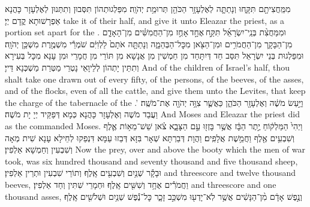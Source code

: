 {מִמַּֽחֲצִיתָ֖ם תִּקָּ֑חוּ וְנָתַתָּ֛ה לְאֶלְעָזָ֥ר הַכֹּהֵ֖ן תְּרוּמַ֥ת יְהֹוָֽה׃}
{מִפַּלְגוּתְהוֹן תִּסְּבוּן וְתִתְּנוּן לְאֶלְעָזָר כָּהֲנָא אַפְרָשׁוּתָא קֳדָם יְיָ׃}
{take it of their half, and give it unto Eleazar the priest, as a portion set apart for the \lord.}{}
{וּמִמַּחֲצִ֨ת בְּנֵֽי־יִשְׂרָאֵ֜ל תִּקַּ֣ח \legarmeh  אֶחָ֣ד \legarmeh  אָחֻ֣ז מִן־הַחֲמִשִּׁ֗ים מִן־הָאָדָ֧ם מִן־הַבָּקָ֛ר מִן־הַחֲמֹרִ֥ים וּמִן־הַצֹּ֖אן מִכׇּל־הַבְּהֵמָ֑ה וְנָתַתָּ֤ה אֹתָם֙ לַלְוִיִּ֔ם שֹׁמְרֵ֕י מִשְׁמֶ֖רֶת מִשְׁכַּ֥ן יְהֹוָֽה׃}
{וּמִפַּלְגוּת בְּנֵי יִשְׂרָאֵל תִּסַּב חַד דְּיִתָּחַד מִן חַמְשִׁין מִן אֲנָשָׁא מִן תּוֹרֵי מִן חֲמָרֵי וּמִן עָנָא מִכָּל בְּעִירָא וְתִתֵּין יָתְהוֹן לְלֵיוָאֵי נָטְרֵי מַטְּרַת מַשְׁכְּנָא דַּייָ׃}
{And of the children of Israel’s half, thou shalt take one drawn out of every fifty, of the persons, of the beeves, of the asses, and of the flocks, even of all the cattle, and give them unto the Levites, that keep the charge of the tabernacle of the \lord.’}{}
{וַיַּ֣עַשׂ מֹשֶׁ֔ה וְאֶלְעָזָ֖ר הַכֹּהֵ֑ן כַּאֲשֶׁ֛ר צִוָּ֥ה יְהֹוָ֖ה אֶת־מֹשֶֽׁה׃}
{וַעֲבַד מֹשֶׁה וְאֶלְעָזָר כָּהֲנָא כְּמָא דְּפַקֵּיד יְיָ יָת מֹשֶׁה׃}
{And Moses and Eleazar the priest did as the \lord\space commanded Moses.}{}
{וַיְהִי֙ הַמַּלְק֔וֹחַ יֶ֣תֶר הַבָּ֔ז אֲשֶׁ֥ר בָּזְז֖וּ עַ֣ם הַצָּבָ֑א צֹ֗אן שֵׁשׁ־מֵא֥וֹת אֶ֛לֶף וְשִׁבְעִ֥ים אֶ֖לֶף וַחֲמֵ֥שֶׁת אֲלָפִֽים׃
}
{וַהֲוָת דְּבַרְתָּא שְׁאָר בִּזָּא דְּבַזוּ עַמָּא דִּנְפַקוּ לְחֵילָא עָנָא שִׁית מְאָה וְשִׁבְעִין וְחַמְשָׁא אַלְפִין׃}
{Now the prey, over and above the booty which the men of war took, was six hundred thousand and seventy thousand and five thousand sheep,}{}
{וּבָקָ֕ר שְׁנַ֥יִם וְשִׁבְעִ֖ים אָֽלֶף׃}
{וְתוֹרֵי שִׁבְעִין וּתְרֵין אַלְפִין׃}
{and threescore and twelve thousand beeves,}{}
{וַחֲמֹרִ֕ים אֶחָ֥ד וְשִׁשִּׁ֖ים אָֽלֶף׃}
{וּחְמָרֵי שִׁתִּין וְחַד אַלְפִין׃}
{and threescore and one thousand asses,}{}
{וְנֶ֣פֶשׁ אָדָ֔ם מִ֨ן־הַנָּשִׁ֔ים אֲשֶׁ֥ר לֹֽא־יָדְע֖וּ מִשְׁכַּ֣ב זָכָ֑ר כׇּל־נֶ֕פֶשׁ שְׁנַ֥יִם וּשְׁלֹשִׁ֖ים אָֽלֶף׃}
